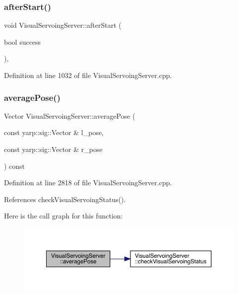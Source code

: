 \subsubsection{\texorpdfstring{after\+Start()}{afterStart()}}
{\footnotesize\ttfamily void Visual\+Servoing\+Server\+::after\+Start (\begin{DoxyParamCaption}\item[{bool}]{success }\end{DoxyParamCaption})\hspace{0.3cm}{\ttfamily [override]}, {\ttfamily [protected]}}



Definition at line 1032 of file Visual\+Servoing\+Server.\+cpp.

\mbox{\label{classVisualServoingServer_a66e3aaa742d5b0d23a6d3a33a800c088}} 
\subsubsection{\texorpdfstring{average\+Pose()}{averagePose()}}
{\footnotesize\ttfamily Vector Visual\+Servoing\+Server\+::average\+Pose (\begin{DoxyParamCaption}\item[{const yarp\+::sig\+::\+Vector \&}]{l\+\_\+pose,  }\item[{const yarp\+::sig\+::\+Vector \&}]{r\+\_\+pose }\end{DoxyParamCaption}) const\hspace{0.3cm}{\ttfamily [private]}}



Definition at line 2818 of file Visual\+Servoing\+Server.\+cpp.



References check\+Visual\+Servoing\+Status().

Here is the call graph for this function\+:
\nopagebreak
\begin{figure}[H]
\begin{center}
\leavevmode
\includegraphics[width=350pt]{classVisualServoingServer_a66e3aaa742d5b0d23a6d3a33a800c088_cgraph}
\end{center}
\end{figure}
\mbox{\label{classVisualServoingServer_abe1d3c25e81378f9a1a834d64cf0c496}} 
